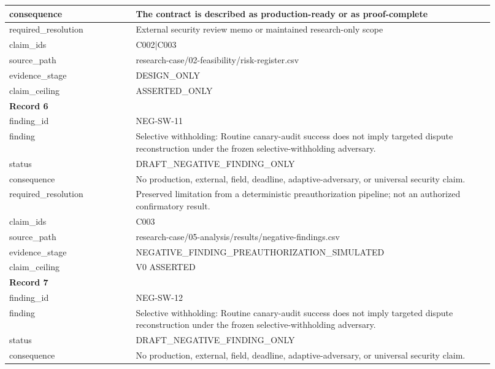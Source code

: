 \begin{longtable}{|p{0.24\linewidth}|p{0.68\linewidth}|}
consequence & The contract is described as production-ready or as proof-complete \\ \hline
required\_\allowbreak{}resolution & External security review memo or maintained research-only scope \\ \hline
claim\_\allowbreak{}ids & C002|C003 \\ \hline
source\_\allowbreak{}path & research-case/02-feasibility/risk-register.csv \\ \hline
evidence\_\allowbreak{}stage & DESIGN\_\allowbreak{}ONLY \\ \hline
claim\_\allowbreak{}ceiling & ASSERTED\_\allowbreak{}ONLY \\ \hline
\multicolumn{2}{|l|}{\textbf{Record 6}} \\ \hline
finding\_\allowbreak{}id & NEG-SW-11 \\ \hline
finding & Selective withholding: Routine canary-audit success does not imply targeted dispute reconstruction under the frozen selective-withholding adversary. \\ \hline
status & DRAFT\_\allowbreak{}NEGATIVE\_\allowbreak{}FINDING\_\allowbreak{}ONLY \\ \hline
consequence & No production, external, field, deadline, adaptive-adversary, or universal security claim. \\ \hline
required\_\allowbreak{}resolution & Preserved limitation from a deterministic preauthorization pipeline;\allowbreak{} not an authorized confirmatory result. \\ \hline
claim\_\allowbreak{}ids & C003 \\ \hline
source\_\allowbreak{}path & research-case/05-analysis/results/negative-findings.csv \\ \hline
evidence\_\allowbreak{}stage & NEGATIVE\_\allowbreak{}FINDING\_\allowbreak{}PREAUTHORIZATION\_\allowbreak{}SIMULATED \\ \hline
claim\_\allowbreak{}ceiling & V0 ASSERTED \\ \hline
\multicolumn{2}{|l|}{\textbf{Record 7}} \\ \hline
finding\_\allowbreak{}id & NEG-SW-12 \\ \hline
finding & Selective withholding: Routine canary-audit success does not imply targeted dispute reconstruction under the frozen selective-withholding adversary. \\ \hline
status & DRAFT\_\allowbreak{}NEGATIVE\_\allowbreak{}FINDING\_\allowbreak{}ONLY \\ \hline
consequence & No production, external, field, deadline, adaptive-adversary, or universal security claim. \\ \hline

\end{longtable}
